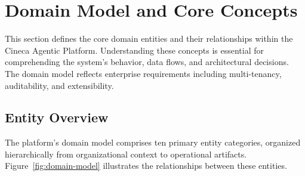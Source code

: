 
\section{Domain Model and Core Concepts}
\label{sec:domain-model}

This section defines the core domain entities and their relationships within the Cineca Agentic Platform. Understanding these concepts is essential for comprehending the system's behavior, data flows, and architectural decisions. The domain model reflects enterprise requirements including multi-tenancy, auditability, and extensibility.

\subsection{Entity Overview}

The platform's domain model comprises ten primary entity categories, organized hierarchically from organizational context to operational artifacts. Figure~\ref{fig:domain-model} illustrates the relationships between these entities.

